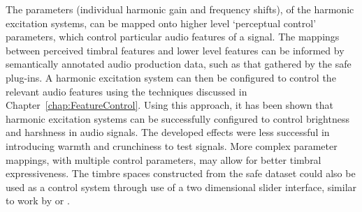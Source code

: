 	The parameters (individual harmonic gain and frequency shifts), of the harmonic excitation systems, can be mapped
	onto higher level `perceptual control' parameters, which control particular audio features of a signal. The
	mappings between perceived timbral features and lower level features can be informed by semantically annotated
	audio production data, such as that gathered by the \acrshort{safe} plug-ins. A harmonic excitation system can then
	be configured to control the relevant audio features using the techniques discussed in
	Chapter~\ref{chap:FeatureControl}. Using this approach, it has been shown that harmonic excitation systems can be
	successfully configured to control brightness and harshness in audio signals. The developed effects were less
	successful in introducing warmth and crunchiness to test signals. More complex parameter mappings, with multiple
	control parameters, may allow for better timbral expressiveness. The timbre spaces constructed from the
	\acrshort{safe} dataset could also be used as a control system through use of a two dimensional slider interface,
	similar to work by \citet{schwarz2007corpus} or \citet{stasis2015a}.
